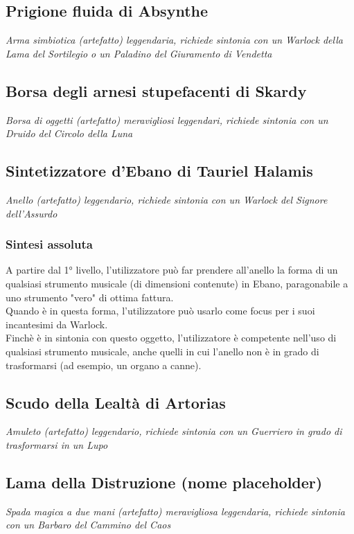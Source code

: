 \subsection{Prigione fluida di Absynthe}
\textit{Arma simbiotica (artefatto) leggendaria, richiede sintonia con un Warlock della Lama del Sortilegio o un Paladino del Giuramento di Vendetta}

\subsection{Borsa degli arnesi stupefacenti di Skardy}
\textit{Borsa di oggetti (artefatto) meravigliosi leggendari, richiede sintonia con un Druido del Circolo della Luna}

\subsection{Sintetizzatore d'Ebano di Tauriel Halamis}
\textit{Anello (artefatto) leggendario, richiede sintonia con un Warlock del Signore dell'Assurdo}

\subsubsection{Sintesi assoluta}
A partire dal 1° livello, l'utilizzatore può far prendere all'anello la forma di un qualsiasi strumento musicale (di dimensioni contenute) in Ebano, paragonabile a uno strumento "vero" di ottima fattura.\\ Quando è in questa forma, l'utilizzatore può usarlo come focus per i suoi incantesimi da Warlock.\\ Finchè è in sintonia con questo oggetto, l'utilizzatore è competente nell'uso di qualsiasi strumento musicale, anche quelli in cui l'anello non è in grado di trasformarsi (ad esempio, un organo a canne).

\subsection{Scudo della Lealtà di Artorias}
\textit{Amuleto (artefatto) leggendario, richiede sintonia con un Guerriero in grado di trasformarsi in un Lupo}

\subsection{Lama della Distruzione (nome placeholder)}
\textit{Spada magica a due mani (artefatto) meravigliosa leggendaria, richiede sintonia con un Barbaro del Cammino del Caos}

